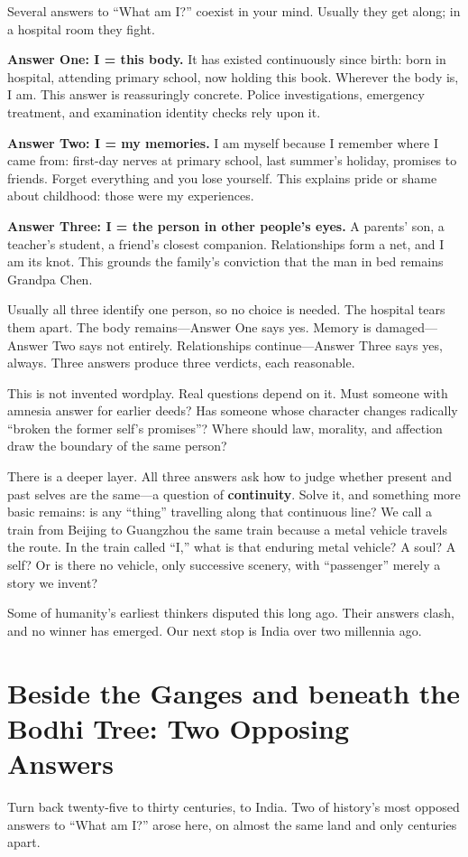 Several answers to ``What am I?'' coexist in your mind. Usually they get along; in a hospital room they fight.

\textbf{Answer One: I = this body.} It has existed continuously since birth: born in hospital, attending primary school, now holding this book. Wherever the body is, I am. This answer is reassuringly concrete. Police investigations, emergency treatment, and examination identity checks rely upon it.

\textbf{Answer Two: I = my memories.} I am myself because I remember where I came from: first-day nerves at primary school, last summer's holiday, promises to friends. Forget everything and you lose yourself. This explains pride or shame about childhood: those were my experiences.

\textbf{Answer Three: I = the person in other people's eyes.} A parents' son, a teacher's student, a friend's closest companion. Relationships form a net, and I am its knot. This grounds the family's conviction that the man in bed remains Grandpa Chen.

Usually all three identify one person, so no choice is needed. The hospital tears them apart. The body remains---Answer One says yes. Memory is damaged---Answer Two says not entirely. Relationships continue---Answer Three says yes, always. Three answers produce three verdicts, each reasonable.

This is not invented wordplay. Real questions depend on it. Must someone with amnesia answer for earlier deeds? Has someone whose character changes radically ``broken the former self's promises''? Where should law, morality, and affection draw the boundary of the same person?

There is a deeper layer. All three answers ask how to judge whether present and past selves are the same---a question of \textbf{continuity}. Solve it, and something more basic remains: is any ``thing'' travelling along that continuous line? We call a train from Beijing to Guangzhou the same train because a metal vehicle travels the route. In the train called ``I,'' what is that enduring metal vehicle? A soul? A self? Or is there no vehicle, only successive scenery, with ``passenger'' merely a story we invent?

Some of humanity's earliest thinkers disputed this long ago. Their answers clash, and no winner has emerged. Our next stop is India over two millennia ago.

\section[Two Opposing Answers in India]{Beside the Ganges and beneath the Bodhi Tree: Two Opposing Answers}
Turn back twenty-five to thirty centuries, to India. Two of history's most opposed answers to ``What am I?'' arose here, on almost the same land and only centuries apart.

